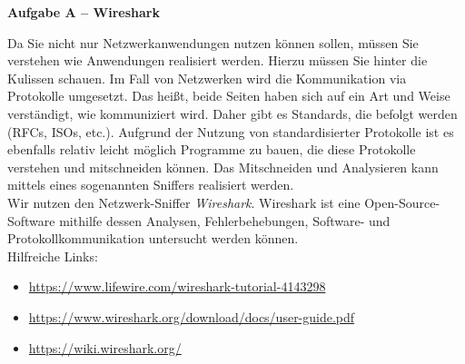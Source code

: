 \documentclass[paper=a4,fontsize=11pt]{scrartcl}%
\numberwithin{equation}{section}
\begin{document}
\newpage
\begin{center}\Large{\textbf{Aufgabe A -- Wireshark}}\end{center}\vskip0.25in
Da Sie nicht nur Netzwerkanwendungen nutzen können sollen, müssen Sie verstehen wie Anwendungen realisiert werden. Hierzu müssen Sie hinter die Kulissen schauen. Im Fall von Netzwerken wird die Kommunikation via Protokolle umgesetzt. Das heißt, beide Seiten haben sich auf ein Art und Weise verständigt, wie kommuniziert wird. Daher gibt es Standards, die befolgt werden (RFCs, ISOs, etc.). Aufgrund der Nutzung von standardisierter Protokolle ist es ebenfalls relativ leicht möglich Programme zu bauen, die diese Protokolle verstehen und mitschneiden können. Das Mitschneiden und Analysieren kann mittels eines sogenannten Sniffers realisiert werden.\\
Wir nutzen den Netzwerk-Sniffer \emph{Wireshark}. Wireshark ist eine Open-Source-Software mithilfe dessen Analysen, Fehlerbehebungen, Software- und Protokollkommunikation untersucht werden können.\\
Hilfreiche Links:
\begin{itemize}
	\item \url{https://www.lifewire.com/wireshark-tutorial-4143298}
	\item \url{https://www.wireshark.org/download/docs/user-guide.pdf}
	\item \url{https://wiki.wireshark.org/}
\end{itemize}
\end{document}
